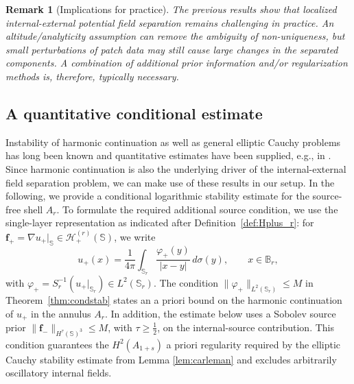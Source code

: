 \documentclass[a4paper, 11pt]{article}
\newtheorem{remark}[theorem]{Remark}
\renewcommand{\SS}{\mathbb{S}}
\newcommand{\BB}{\mathbb{B}}
\newcommand{\f}{\mathbf{f}}
\begin{document}
\begin{remark}[Implications for practice]\label{rem:practice}
The previous results show that localized internal-external potential field separation remains challenging in practice. An altitude/analyticity assumption can remove the ambiguity of non-uniqueness, but small perturbations of patch data may still cause large changes in the separated components. A combination of additional prior information and/or regularization methods is, therefore, typically necessary. 
\end{remark}


\subsection{A quantitative conditional estimate}

Instability of harmonic continuation as well as general elliptic Cauchy problems has long been known and quantitative estimates have been supplied, e.g., in \cite{aleron09,bou10,isakov12,ruesal19}. Since harmonic continuation is also the underlying driver of the internal-external field separation problem, we can make use of these results in our setup. In the following, we provide a conditional logarithmic stability estimate for the source-free shell $A_r$. To formulate the required additional source condition, we use the single-layer representation as indicated after Definition~\ref{def:Hplus_r}: for $\f_+=\nabla u_+|_\SS\in \mathcal H_+^{(r)}(\SS)$, we write
\[
	u_+(x)=\frac{1}{4\pi}\int_{\SS_r}\frac{\varphi_+(y)}{|x-y|}\,d\sigma(y),
	\qquad x\in\BB_r,
\]
with $\varphi_+=S_r^{-1}(u_+|_{\SS_r})\in L^2(\SS_r)$. The condition $\|\varphi_+\|_{L^2(\SS_r)}\le M$ in Theorem~\ref{thm:condstab} states an a priori bound on the harmonic continuation of $u_+$ in the annulus $A_r$.
In addition, the estimate below uses a Sobolev source prior
$\|\f_-\|_{H^\tau(\SS)^3}\le M$, with $\tau\geq\frac12$, on the internal-source
contribution. This condition guarantees the $H^2(A_{1+s})$ a priori regularity required
by the elliptic Cauchy stability estimate from Lemma \ref{lem:carleman} and excludes arbitrarily oscillatory internal fields.
\end{document}
